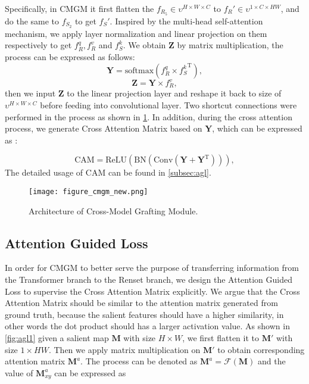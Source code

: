 \documentclass[10pt,twocolumn,letterpaper]{article}
\begin{document}
Specifically, in CMGM it first flatten the $f_{{R}_5} \in \upsilon^{H\times W\times C}$ to $f_{{R}}' \in \upsilon^{1\times C\times HW}$, and do the same to $f_{{{S}}_2}$ to get $f_{{S}}'$. Inspired by the multi-head self-attention mechanism, we apply layer normalization and linear projection on them respectively to get $f_{R}^q, f_{R}^v$ and $f_{S}^k$. We obtain $\bm{Z}$ by matrix multiplication, the process can be expressed as follows:
\begin{equation}
    \bm{Y} = \text {softmax}(f_{R}^q \times {f_{S}^k}^\mathrm{T})  ,
\end{equation}
\begin{equation}
    \bm{Z} = \bm{Y} \times f_{R}^v   ,
\end{equation}
then we input $\bm{Z}$ to the linear projection layer and reshape it back to size of $\upsilon^{H\times W\times C}$ before feeding into convolutional layer. Two shortcut connections were performed in the process as shown in \cref{fig:cmgm}. In addition, during the cross attention process, we generate Cross Attention Matrix based on $\bm{Y}$, which can be expressed as :

\begin{equation}
    \mathrm{CAM} = \text{ReLU}(\text{BN}(\text{Conv}(\bm{Y}+\bm{Y}^\mathrm{T})))   ,
\end{equation}
The detailed usage of $\mathrm{CAM}$ can be found in \cref{subsec:agl}.


\begin{figure}[t]

\centering
\texttt{[image: figure\_cmgm\_new.png]}
\caption{Architecture of Cross-Model Grafting Module. }
\label{fig:cmgm}
\end{figure}
\label{subsec:CMGM}


\subsection{Attention Guided Loss}
In order for CMGM  to better serve the purpose of transferring information from the Transformer branch to the Renset branch, we design the Attention Guided Loss to supervise the Cross Attention Matrix explicitly. We argue that the Cross Attention Matrix should be similar to the attention matrix generated from ground truth, because the salient features should have a higher similarity, in other words the dot product should has a larger activation value.
As shown in \cref{fig:agl1} given a salient map $\bm{M}$ with size $H \times W$, we first flatten it to $\bm{M}'$ with size $1 \times HW$. Then we apply matrix multiplication on $\bm{M}'$ to obtain corresponding attention matrix $\bm{M}^{a}$. The process can be denoted as $\bm{M}^{a} = \mathcal {F} \left( \bm{M} \right)$ and the value of $\bm{M}^{a}_{xy}$ can be expressed as 
\end{document}
